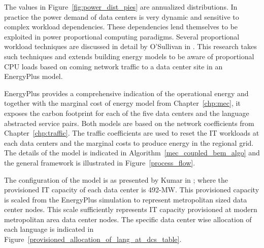     
    
    The values in Figure~\ref{fig:power_dist_pies} are annualized distributions. In practice the power demand of data centers is very dynamic and sensitive to complex workload dependencies. These dependencies lend themselves to be exploited in power proportional computing paradigms. Several proportional workload techniques are discussed in detail by O'Sullivan in \cite{osullivan15}. This research takes such techniques and extends building energy models to be aware of proportional CPU loads based on coming network traffic to a data center site in an EnergyPlus model.
    
    EnergyPlus provides a comprehensive indication of the operational energy and together with the marginal cost of energy model from Chapter~\ref{chp:mec}, it exposes the carbon footprint for each of the five data centers and the language abstracted service pairs. Both models are based on the network coefficients  from Chapter~\ref{chp:traffic}. The traffic coefficients are used to reset the IT workloads at each data centers and the marginal costs to produce energy in the regional grid. The details of the model is indicated in Algorithm~\ref{mec_coupled_bem_algo} and the general framework is illustrated in Figure~\ref{process_flow}. 
    
    
    
    
    
     The configuration of the model is as presented by Kumar in \cite{kumar20b}; where the provisioned IT capacity of each data center is 492-MW. This provisioned capacity is scaled from the EnergyPlus simulation to represent metropolitan sized data center nodes. This scale sufficiently represents IT capacity provisioned at modern metropolitan area data center nodes. The specific data center wise allocation of each language is indicated in Figure~\ref{provisioned_allocation_of_lang_at_dcs_table}.
     
     
    
